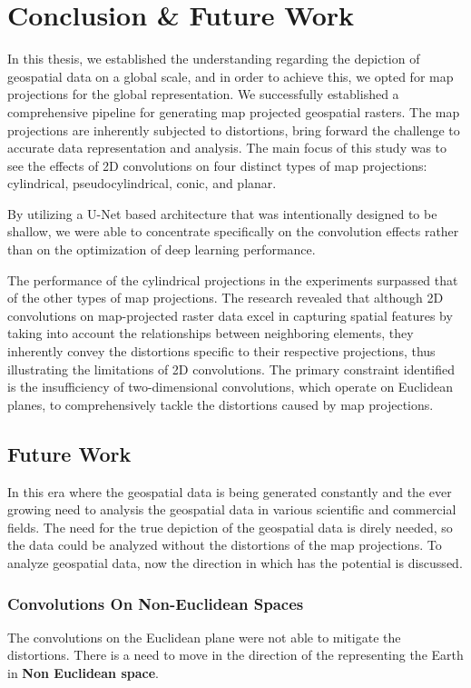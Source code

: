 
\clearpage
\cleardoublepage

\chapter{Conclusion \& Future Work}
\label{chap:conclusion_future_work}
In this thesis, we established the understanding regarding the depiction of geospatial data on a global scale, and in order to achieve this, we opted for map projections for the global representation.
We successfully established a comprehensive pipeline for generating map projected geospatial rasters. The map projections are inherently subjected to distortions, bring forward the challenge to accurate data representation and analysis.
The main focus of this study was to see the effects of 2D convolutions on four distinct types of map projections: cylindrical, pseudocylindrical, conic, and planar.

By utilizing a U-Net based architecture that was intentionally designed to be shallow, we were able to concentrate specifically on the convolution effects rather than on the optimization of deep learning performance.

The performance of the cylindrical projections in the experiments surpassed that of the other types of map projections.
The research revealed that although 2D convolutions on map-projected raster data excel in capturing spatial features by taking into account the relationships between neighboring elements,
they inherently convey the distortions specific to their respective projections, thus illustrating the limitations of 2D convolutions.
The primary constraint identified is the insufficiency of two-dimensional convolutions, which operate on Euclidean planes,
to comprehensively tackle the distortions caused by map projections.

\section*{Future Work}
In this era where the geospatial data is being generated constantly and the ever growing need to analysis the geospatial data in various scientific and commercial fields. The need for the true depiction of the geospatial data is direly needed, so the data could be analyzed without the distortions of the map projections.
To analyze geospatial data, now the direction in which has the potential is discussed.
\subsection*{Convolutions On Non-Euclidean Spaces}
The convolutions on the Euclidean plane were not able to mitigate the distortions.
There is a need to move in the direction of the representing the Earth in \textbf{Non Euclidean space}.

